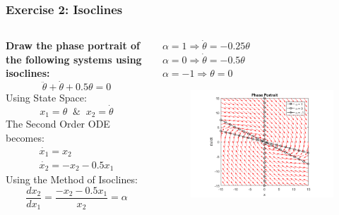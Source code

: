 \documentclass[11pt,handout]{beamer}   %
\begin{document}
\begin{frame}
\frametitle{Exercise 2: Isoclines}
\begin{columns}
\begin{column}{0.5\textwidth}
\small
\textbf{Draw the phase portrait of the following systems using isoclines:}
\begin{equation*}
\ddot{\theta} + \dot{\theta} + 0.5\theta = 0
\end{equation*}
Using State Space:
\begin{equation*}
x_1 = \theta \;\; \& \;\; x_2 = \dot{\theta}
\end{equation*}
The Second Order ODE becomes:
\begin{equation*}
\begin{aligned}
\dot{x_1} = x_2\\
\dot{x_2} = -x_2 - 0.5 x_1
\end{aligned}
\end{equation*}
Using the Method of Isoclines:
\begin{equation*}
\frac{dx_2}{dx_1} = \frac{-x_2 - 0.5 x_1}{x_2} = \alpha
\end{equation*}
\end{column}
\begin{column}{0.5\textwidth}
\small
\centering
$\alpha = 1 \Rightarrow \dot{\theta} = -0.25 \theta$\\
$\alpha = 0 \Rightarrow \dot{\theta} = -0.5 \theta$\\
$\alpha = -1 \Rightarrow \theta = 0$
\begin{figure}
\centering
\includegraphics[width = \textwidth]{Figures/Isocline_3.png}
\end{figure}
\end{column}
\end{columns}
\end{frame}
\end{document}

